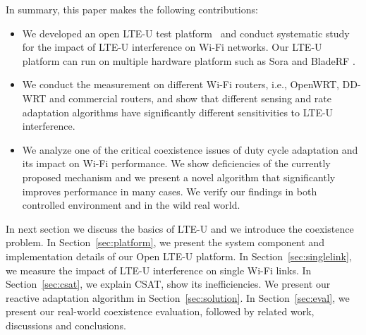 

In summary, this paper makes the following contributions:
\begin{itemize}
\item We developed an open LTE-U test platform~\cite{OpenLTEU} 
  and conduct systematic study for 
  the impact of LTE-U interference on Wi-Fi networks.
  Our LTE-U platform can run on multiple hardware platform such as 
    Sora \cite{sora} and BladeRF \cite{bladeRF}. 

\item We conduct the measurement on different Wi-Fi routers, 
  i.e., OpenWRT, DD-WRT and commercial routers,
  and show that different sensing and rate adaptation algorithms have 
    significantly different sensitivities to LTE-U interference.

\item We analyze one of the critical coexistence issues of duty cycle adaptation and its impact on Wi-Fi performance. We show deficiencies of the currently proposed mechanism and we present a novel algorithm that significantly improves performance in many cases. 
We verify our findings in both controlled environment and in the wild real world.

\end{itemize} 



In next section we discuss the basics of LTE-U and we introduce the coexistence problem. 
In Section~\ref{sec:platform}, we present the system component
and implementation details of our Open LTE-U platform.
In Section~\ref{sec:singlelink}, we measure the impact of LTE-U
interference on single Wi-Fi links.
In Section~\ref{sec:csat}, we explain CSAT, show its inefficiencies.
We present our reactive adaptation algorithm in Section~\ref{sec:solution}. 
In Section~\ref{sec:eval}, we present our real-world coexistence evaluation, followed by related work, discussions and conclusions.

